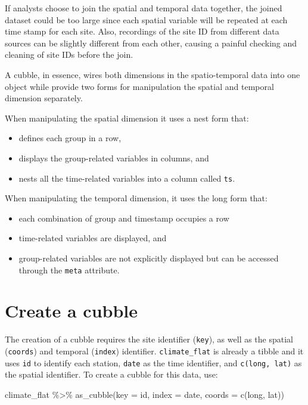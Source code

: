 \documentclass{article}
\newenvironment{Shaded}{\begin{snugshade}}{\end{snugshade}}
\newcommand{\AttributeTok}[1]{\textcolor[rgb]{0.77,0.63,0.00}{#1}}
\newcommand{\FunctionTok}[1]{\textcolor[rgb]{0.00,0.00,0.00}{#1}}
\newcommand{\NormalTok}[1]{#1}
\newcommand{\SpecialCharTok}[1]{\textcolor[rgb]{0.00,0.00,0.00}{#1}}
\begin{document}
If analysts choose to join the spatial and temporal data together, the
joined dataset could be too large since each spatial variable will be
repeated at each time stamp for each site. Also, recordings of the site
ID from different data sources can be slightly different from each
other, causing a painful checking and cleaning of site IDs before the
join.

A cubble, in essence, wires both dimensions in the spatio-temporal data
into one object while provide two forms for manipulation the spatial and
temporal dimension separately.

When manipulating the spatial dimension it uses a nest form that:

\begin{itemize}
\tightlist
\item
  defines each group in a row,
\item
  displays the group-related variables in columns, and
\item
  nests all the time-related variables into a column called \texttt{ts}.
\end{itemize}

When manipulating the temporal dimension, it uses the long form that:

\begin{itemize}
\tightlist
\item
  each combination of group and timestamp occupies a row
\item
  time-related variables are displayed, and
\item
  group-related variables are not explicitly displayed but can be
  accessed through the \texttt{meta} attribute.
\end{itemize}

\newpage

\hypertarget{create-a-cubble}{%
\section{Create a cubble}\label{create-a-cubble}}

The creation of a cubble requires the site identifier (\texttt{key}), as
well as the spatial (\texttt{coords}) and temporal (\texttt{index})
identifier. \texttt{climate\_flat} is already a tibble and it uses
\texttt{id} to identify each station, \texttt{date} as the time
identifier, and \texttt{c(long,\ lat)} as the spatial identifier. To
create a cubble for this data, use:

\begin{Shaded}
\begin{Highlighting}[]
\NormalTok{climate\_flat }\SpecialCharTok{\%\textgreater{}\%} \FunctionTok{as\_cubble}\NormalTok{(}\AttributeTok{key =}\NormalTok{ id, }\AttributeTok{index =}\NormalTok{ date, }\AttributeTok{coords =} \FunctionTok{c}\NormalTok{(long, lat))}
\end{Highlighting}
\end{Shaded}
\end{document}
